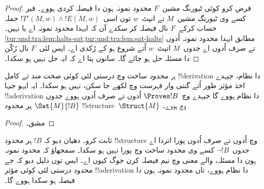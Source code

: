 \documentclass[../../../include/open-logic-section]{subfiles}
\begin{document}
\begin{proof}
  فرض کرو کوئی ٹیورنگ مشین~$F$
  محدود نمونہ ہون دا فیصلہ
  کردی ہووے۔ فیر کسے وی
  ٹیورنگ مشین~$M$ تے انپٹ~$w$
  توں اسی~$!T'(M,w) \land !E(M,w)$
  جملہ حساب کرکے~$F$ نال فیصلہ
  کر سکدے آں کہ ایہدا محدود
  نمونہ اے یا نہیں۔
  \cref{tur:und:tra:lem:halts-sat,tur:und:tra:lem:sat-halts}
  مطابق ایہدا محدود نمونہ اُدوں تے
  صرف اُدوں اے جدوں~$M$ انپٹ~$w$
  اُتے شروع ہو کے رُکدی اے۔
  ایس لئی~$F$ نال رُکّن دا
  مسئلہ حل ہو جائے گا۔ سانوں
  پتا اے کہ ایہ حل نہیں ہو سکدا۔
\end{proof}

\begin{cor}%
  ہر \emph{محدود} ساخت وچ درستی لئی
  کوئی صحت مند تے کامل !!{derivation} دا نظام،
  جیہدے اخذ مؤثر طور اُتے گنتی وار
  فہرست وچ لکھے جا سکن، نہیں ہو سکدا۔
  ایہ ایہو جیہا !!a{derivation} دا نظام ہووے گا
  جیہدے وچ~$\Proves !B$
  اُدوں تے صرف اُدوں ہووے جدوں
  $\Sat{M}{!B}$ ہر محدود
  !!{structure}~$\Struct{M}$ وچ ہووے۔
\end{cor}

\begin{proof}
  مشق۔
\end{proof}

\begin{prob}
  ثابت کرو۔ دھیان دیو کہ
  $!B$ ہر محدود !!{structure}
  وچ اُدوں تے صرف اُدوں پورا اتردا
  اے جدوں~$\lnot !B$ کسے وی محدود
  ساخت وچ پورا نہیں ہو سکدا۔
  سمجھاؤ کہ محدود نمونہ ہون دا مسئلہ،
  والے معنی وچ نیم فیصلہ
  کرن جوگ کیوں اے۔ ایس
  توں دلیل دیو کہ جے محدود
  درستی لئی کوئی مؤثر
  !!a{derivation} دا نظام
  ہووے، تاں محدود نمونہ ہون دا
  فیصلہ ہو سکدا ہووے گا۔
\end{prob}
\end{document}
